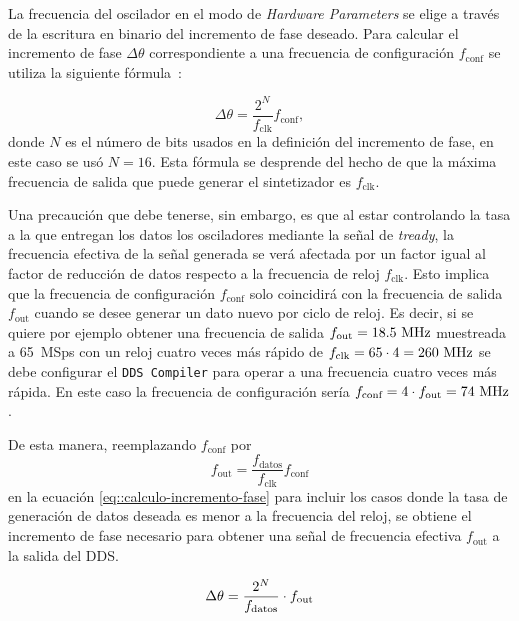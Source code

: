 \documentclass[../../main.tex]{subfiles}
\begin{document}
La frecuencia del oscilador en el modo de \textit{Hardware Parameters} se elige a través de la escritura en binario del incremento de fase deseado. Para calcular el incremento de fase $\Delta \theta$ correspondiente a una frecuencia de configuración $f_\textrm{conf}$ se utiliza la siguiente fórmula~\cite[p. 17]{dds-compiler}:

\begin{equation}
     \Delta \theta = \frac{2^N}{f_\textrm{clk}} f_\textrm{conf},
     \label{eq::calculo-incremento-fase}
\end{equation}
donde $N$ es el número de bits usados en la definición del incremento de fase, en este caso se usó $N = 16$. Esta fórmula se desprende del hecho de que la máxima frecuencia de salida que puede generar el sintetizador es $f_\textrm{clk}$.

Una precaución que debe tenerse, sin embargo, es que al estar controlando la tasa a la que entregan los datos los osciladores mediante la señal de \textit{tready}, la frecuencia efectiva de la señal generada se verá afectada por un factor igual al factor de reducción de datos respecto a la frecuencia de reloj $f_\textrm{clk}$. 
Esto implica que la frecuencia de configuración $f_\textrm{conf}$ solo coincidirá con la frecuencia de salida $f_\textrm{out}$ cuando se desee generar un dato nuevo por ciclo de reloj. 
Es decir, si se quiere por ejemplo obtener una frecuencia de salida $f_\textrm{out} = 18.5~\textrm{MHz}$ muestreada a 65~MSps con un reloj cuatro veces más rápido de $f_\textrm{clk} = 65 \cdot 4 = 260~\textrm{MHz}$ se debe configurar el \texttt{DDS Compiler} para operar a una frecuencia cuatro veces más rápida. En este caso la frecuencia de configuración sería $f_\textrm{conf} = 4 \cdot f_\textrm{out} = 74~\textrm{MHz}$.

De esta manera, reemplazando $f_\textrm{conf}$ por \[f_\textrm{out} = \frac{f_\textrm{datos}}{f_\textrm{clk}}f_\textrm{conf}\] en la ecuación \ref{eq::calculo-incremento-fase} para incluir los casos donde la tasa de generación de datos deseada es menor a la frecuencia del reloj, se obtiene el incremento de fase necesario para obtener una señal de frecuencia efectiva $f_\textrm{out}$ a la salida del DDS.

\begin{equation}
    \Delta \theta = \frac{2^N}{f_\textrm{datos}} \cdot f_\textrm{out} \\
    \label{eq::calculo-incremento-fase-v2}
\end{equation}
\end{document}
